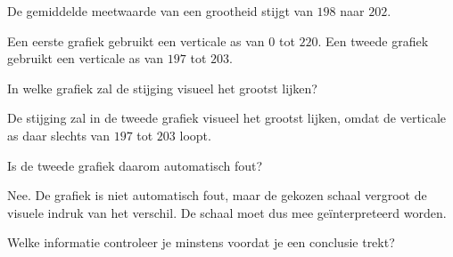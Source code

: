 \documentclass{ximera}
\begin{document}

\begin{oefening}{\oefU \ESS}

De gemiddelde meetwaarde van een grootheid stijgt van $198$ naar $202$.

Een eerste grafiek gebruikt een verticale as van $0$ tot $220$.
Een tweede grafiek gebruikt een verticale as van $197$ tot $203$.

\begin{question}
In welke grafiek zal de stijging visueel het grootst lijken?

\begin{multipleChoice}
\end{multipleChoice}


\begin{oplossing}
De stijging zal in de tweede grafiek visueel het grootst lijken,
omdat de verticale as daar slechts van $197$ tot $203$ loopt.
\end{oplossing}

\end{question}

\begin{question}
Is de tweede grafiek daarom automatisch fout?

\begin{multipleChoice}
\end{multipleChoice}


\begin{oplossing}
Nee. De grafiek is niet automatisch fout, maar de gekozen schaal
vergroot de visuele indruk van het verschil. De schaal moet dus
mee geïnterpreteerd worden.
\end{oplossing}

\end{question}

\begin{question}
Welke informatie controleer je minstens voordat je een conclusie trekt?

\begin{selectAll}
\end{selectAll}



\end{question}
\end{oefening}
\end{document}
